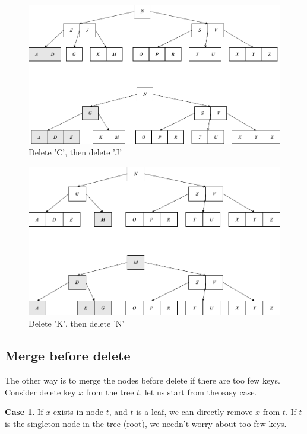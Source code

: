 \documentclass[b5paper]{article}
\begin{document}
\begin{figure}[htbp]
  \centering
  \includegraphics[scale=0.33]{img/btree-del-CJ.png}
  \caption{Delete 'C', then delete 'J'}
  \label{fig:btree-del-CJ}
\end{figure}

\begin{figure}[htbp]
  \centering
  \includegraphics[scale=0.33]{img/btree-del-KN.png}
  \caption{Delete 'K', then delete 'N'}
  \label{fig:btree-del-KN}
\end{figure}

\subsection{Merge before delete}

The other way is to merge the nodes before delete if there are too few keys. Consider delete key $x$ from the tree $t$, let us start from the easy case.

\textbf{Case 1}. If $x$ exists in node $t$, and $t$ is a leaf, we can directly remove $x$ from $t$. If $t$ is the singleton node in the tree (root), we needn't worry about too few keys.
\end{document}
